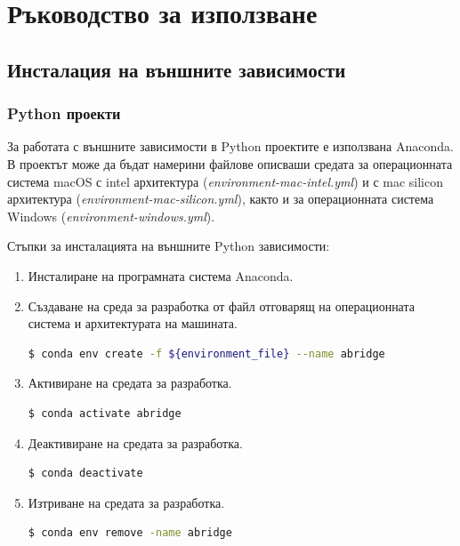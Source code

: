 \documentclass{article}
\begin{document}
\newpage\section{Ръководство за използване}

\subsection{Инсталация на външните зависимости}

\subsubsection{Python проекти}

За работата с външните зависимости в Python проектите е използвана Anaconda. В проектът може да бъдат намерини
файлове описваши средата за операционната система macOS с intel архитектура (\textit{environment-mac-intel.yml}) и с
mac silicon архитектура (\textit{environment-mac-silicon.yml}), както и за операционната система Windows
(\textit{environment-windows.yml}).

Стъпки за инсталацията на външните Python зависимости:

\begin{enumerate}
\item Инсталиране на програмната система Anaconda. \cite{anaconda-installation}
\item Създаване на среда за разработка от файл отговарящ на операционната система и архитектурата на машината.
\begin{lstlisting}[language=bash, numbers=none, caption=Създаване на среда за разработка за Python проектите.]
$ conda env create -f ${environment_file} --name abridge
\end{lstlisting}
\item Активиране на средата за разработка.
\begin{lstlisting}[language=bash, numbers=none, caption=Активиране на средата за разработка за Python проектите.]
$ conda activate abridge
\end{lstlisting}
\item Деактивиране на средата за разработка.
\begin{lstlisting}[language=bash, numbers=none, caption=Деактивиране на средата за разработка за Python проектите.]
$ conda deactivate
\end{lstlisting}
\item Изтриване на средата за разработка.
\begin{lstlisting}[language=bash, numbers=none, caption=Изтриване на средата за разработка за Python проектите.]
$ conda env remove -name abridge
\end{lstlisting}
\end{enumerate}
\end{document}
